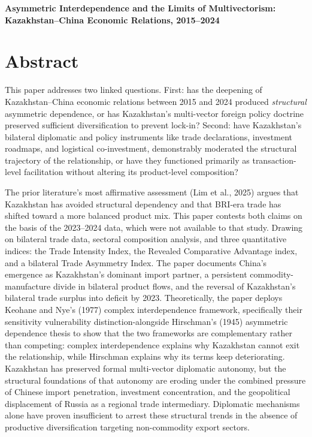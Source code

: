 \documentclass[12pt]{article}
\begin{document}
\begin{center}
{\Large \textbf{Asymmetric Interdependence and the Limits of Multivectorism:\\
Kazakhstan--China Economic Relations, 2015--2024}}\\[1em]
\end{center}

\section*{Abstract}

This paper addresses two linked questions. First: has the deepening of Kazakhstan--China economic relations between 2015 and 2024 produced \textit{structural} asymmetric dependence, or has Kazakhstan's multi-vector foreign policy doctrine preserved sufficient diversification to prevent lock-in? Second: have Kazakhstan's bilateral diplomatic and policy instruments like trade declarations, investment roadmaps, and logistical co-investment, demonstrably moderated the structural trajectory of the relationship, or have they functioned primarily as transaction-level facilitation without altering its product-level composition?

The prior literature's most affirmative assessment (Lim et al., 2025) argues that Kazakhstan has avoided structural dependency and that BRI-era trade has shifted toward a more balanced product mix. This paper contests both claims on the basis of the 2023--2024 data, which were not available to that study. Drawing on bilateral trade data, sectoral composition analysis, and three quantitative indices: the Trade Intensity Index, the Revealed Comparative Advantage index, and a bilateral Trade Asymmetry Index. The paper documents China's emergence as Kazakhstan's dominant import partner, a persistent commodity-manufacture divide in bilateral product flows, and the reversal of Kazakhstan's bilateral trade surplus into deficit by 2023. Theoretically, the paper deploys Keohane and Nye's (1977) complex interdependence framework, specifically their sensitivity vulnerability distinction-alongside Hirschman's (1945) asymmetric dependence thesis to show that the two frameworks are complementary rather than competing: complex interdependence explains why Kazakhstan cannot exit the relationship, while Hirschman explains why its terms keep deteriorating. Kazakhstan has preserved formal multi-vector diplomatic autonomy, but the structural foundations of that autonomy are eroding under the combined pressure of Chinese import penetration, investment concentration, and the geopolitical displacement of Russia as a regional trade intermediary. Diplomatic mechanisms alone have proven insufficient to arrest these structural trends in the absence of productive diversification targeting non-commodity export sectors.
\end{document}
